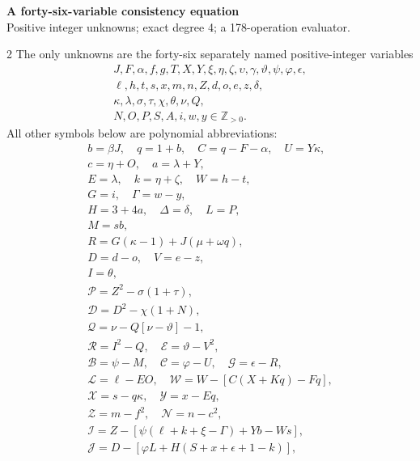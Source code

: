 \documentclass[10pt]{article}
\begin{document}
\begin{center}
{\large\bfseries A forty-six-variable consistency equation}\\[-1pt]
{\small Positive integer unknowns; exact degree 4; a 178-operation evaluator.}
\end{center}\vspace{-8pt}
\begin{multicols}{2}
\fontsize{8.6}{9.1}\selectfont
The only unknowns are the forty-six separately named positive-integer variables
\[
\begin{gathered}J,F,\alpha,f,g,T,X,Y,\xi,\eta,\zeta,\upsilon,\gamma,\vartheta,\psi,\varphi,\epsilon,\\
\ell,h,t,s,x,m,n,Z,d,o,e,z,\delta,\\
\kappa,\lambda,\sigma,\tau,\chi,\theta,\nu,Q,\\
N,O,P,S,A,i,w,y\in\mathbb Z_{>0}.\end{gathered}
\]
All other symbols below are polynomial abbreviations:
\[
\begin{gathered}
b=\beta J,\quad q=1+b,\quad C=q-F-\alpha,\quad U=Y\kappa,\\
c=\eta+O,\quad a=\lambda+Y,\\
E=\lambda,\quad k=\eta+\zeta,\quad W=h-t,\\
G=i,\quad\Gamma=w-y,\\
H=3+4a,\quad\Delta=\delta,\quad L=P,\\
M=sb,\\
R=G(\kappa-1)+J(\mu+\omega q),\\
D=d-o,\quad V=e-z,\\
I=\theta,\\
\mathcal{P}=Z^2-\sigma(1+\tau),\\
\mathcal{D}=D^2-\chi(1+N),\\
\mathcal{Q}=\nu-Q[\nu-\vartheta]-1,\\
\mathcal{R}=I^2-Q,\quad \mathcal{E}=\vartheta-V^2,\\
\mathcal{B}=\psi-M,\quad \mathcal{C}=\varphi-U,\quad \mathcal{G}=\epsilon-R,\\
\mathcal{L}=\ell-EO,\quad \mathcal{W}=W-[C(X+Kq)-Fq],\\
\mathcal{X}=s-q\kappa,\quad \mathcal{Y}=x-Eq,\\
\mathcal{Z}=m-f^2,\quad \mathcal{N}=n-c^2,\\
\mathcal{I}=Z-[\psi(\ell+k+\xi-\Gamma)+Yb-Ws],\\
\mathcal{J}=D-[\varphi L+H(S+x+\epsilon+1-k)],\\

\end{gathered}\]
\end{multicols}
\end{document}
